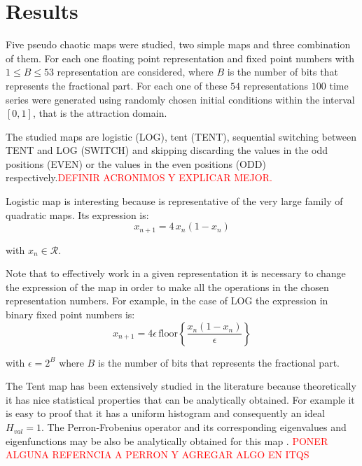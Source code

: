 \section{Results}\label{sec:resultados}

Five pseudo chaotic maps were studied, two simple maps and three combination of them.
For each one floating point representation and fixed point numbers with $1\leq B \leq 53$ representation are considered, where $B$ is the number of bits that represents the fractional part.
For each one of these $54$ representations $100$ time series were generated using randomly chosen initial conditions within the interval $[0,1]$, that is the attraction domain.

The studied maps are logistic (LOG), tent (TENT), sequential switching between TENT and LOG (SWITCH) and skipping discarding the values in the odd positions (EVEN) or the values in the even positions (ODD) respectively.\textcolor{red}{DEFINIR ACRONIMOS Y EXPLICAR MEJOR.}

Logistic map is interesting because is representative of the very large family of quadratic maps.
Its expression is:%
%
\begin{equation}\label{eq:logimap}
x_{n+1}=4\,x_{n}(1-x_{n}) 
\end{equation}

\noindent with $x_n\in\mathcal{R}$.

Note that to effectively work in a given representation it is necessary to change the expression of the map in order to make all the operations in the chosen representation numbers. For example, in the case of LOG the expression in binary fixed point numbers is:%
%
\begin{equation}\label{eq:logimapB2}
x_{n+1}=4 \epsilon \,\text{floor}\left\{\frac{x_n(1-x_n)}{\epsilon}\right\}
\end{equation}

\noindent with $\epsilon = 2^B$ where $B$ is the number of bits that represents the fractional part.

The Tent map has been extensively studied in the literature because theoretically it has nice statistical properties that can be analytically obtained.
For example it is easy to proof that it has a uniform histogram and consequently an ideal $H_{val}=1$.
The Perron-Frobenius operator and its corresponding eigenvalues and eigenfunctions may be also be analytically obtained for this map \cite{tent}.
\textcolor{red}{PONER ALGUNA REFERNCIA A PERRON Y AGREGAR ALGO EN ITQS}

